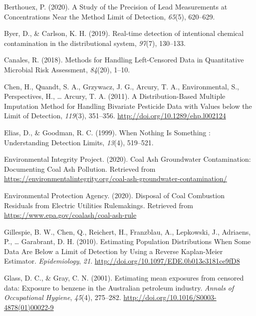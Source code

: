 \documentclass[12pt, twoside]{amherstthesis}
\newlength{\cslhangindent}
\newenvironment{cslreferences}%
  {\setlength{\parindent}{0pt}%
  \everypar{\setlength{\hangindent}{\cslhangindent}}\ignorespaces}%
  {\par}
\begin{document}
\hypertarget{refs}{}
\begin{cslreferences}
\leavevmode\hypertarget{ref-Berthouex2020}{}%
Berthouex, P. (2020). A Study of the Precision of Lead Measurements at Concentrations Near the Method Limit of Detection, \emph{65}(5), 620--629.

\leavevmode\hypertarget{ref-Byer2019}{}%
Byer, D., \& Carlson, K. H. (2019). Real-time detection of intentional chemical contamination in the distributional system, \emph{97}(7), 130--133.

\leavevmode\hypertarget{ref-Canales2018}{}%
Canales, R. (2018). Methods for Handling Left-Censored Data in Quantitative Microbial Risk Assessment, \emph{84}(20), 1--10.

\leavevmode\hypertarget{ref-Chen2011}{}%
Chen, H., Quandt, S. A., Grzywacz, J. G., Arcury, T. A., Environmental, S., Perspectives, H., \ldots{} Arcury, T. A. (2011). A Distribution-Based Multiple Imputation Method for Handling Bivariate Pesticide Data with Values below the Limit of Detection, \emph{119}(3), 351--356. \url{http://doi.org/10.1289/ehp.l002124}

\leavevmode\hypertarget{ref-Elias1999}{}%
Elias, D., \& Goodman, R. C. (1999). When Nothing Is Something : Understanding Detection Limits, \emph{13}(4), 519--521.

\leavevmode\hypertarget{ref-EIP2020}{}%
Environmental Integrity Project. (2020). Coal Ash Groundwater Contamination: Documenting Coal Ash Pollution. Retrieved from \url{https://environmentalintegrity.org/coal-ash-groundwater-contamination/}

\leavevmode\hypertarget{ref-Car2020}{}%
Environmental Protection Agency. (2020). Disposal of Coal Combustion Residuals from Electric Utilities Rulemakings. Retrieved from \url{https://www.epa.gov/coalash/coal-ash-rule}

\leavevmode\hypertarget{ref-Gillespie2010}{}%
Gillespie, B. W., Chen, Q., Reichert, H., Franzblau, A., Lepkowski, J., Adriaens, P., \ldots{} Garabrant, D. H. (2010). Estimating Population Distributions When Some Data Are Below a Limit of Detection by Using a Reverse Kaplan-Meier Estimator. \emph{Epidemiology}, \emph{21}. \url{http://doi.org/10.1097/EDE.0b013e3181ce9fD8}

\leavevmode\hypertarget{ref-Glass2001}{}%
Glass, D. C., \& Gray, C. N. (2001). Estimating mean exposures from censored data: Exposure to benzene in the Australian petroleum industry. \emph{Annals of Occupational Hygiene}, \emph{45}(4), 275--282. \url{http://doi.org/10.1016/S0003-4878(01)00022-9}


\end{cslreferences}
\end{document}
